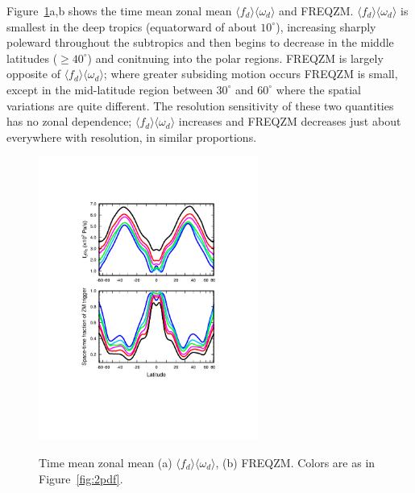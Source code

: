 Figure~\ref{fig:vomg}a,b shows the time mean zonal mean $\langle f_{d} \rangle \langle \omega_{d} \rangle$ and FREQZM. $\langle f_{d} \rangle \langle \omega_{d} \rangle$ is smallest in the deep tropics (equatorward of about $10^{\circ}$), increasing sharply poleward throughout the subtropics and then begins to decrease in the middle latitudes ($\geq 40^{\circ}$) and conitnuing into the polar regions. FREQZM is largely opposite of $\langle f_{d} \rangle \langle \omega_{d} \rangle$; where greater subsiding motion occurs FREQZM is small, except in the mid-latitude region between $30^{\circ}$ and $60^{\circ}$ where the spatial variations are quite different. The resolution sensitivity of these two quantities has no zonal dependence; $\langle f_{d} \rangle \langle \omega_{d} \rangle$ increases and FREQZM decreases just about everywhere with resolution, in similar proportions.

\begin{figure}[t]
\begin{center}
\noindent\includegraphics[width=17pc,angle=0]{figs/temp_zonal_fracd*vomgd.pdf}\\
\end{center}
\caption{Time mean zonal mean (a) $\langle f_{d} \rangle \langle \omega_{d} \rangle$, (b) FREQZM. Colors are as in Figure~\ref{fig:2pdf}.}
\label{fig:vomg}
\end{figure}

